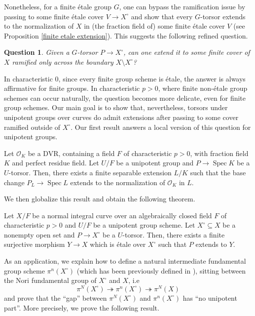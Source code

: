 \documentclass[a4paper,english,12pt]{amsart}
\newtheorem*{question}{Question}
\numberwithin{equation}{section}
\newenvironment{customthm}[1]
  {\renewcommand\theinnercustomthm{#1}\innercustomthm}
  {\endinnercustomthm}
\DeclareMathOperator{\Spec}{Spec}
\renewcommand{\_}{\rule{0.25cm}{0.4pt}}
\begin{document}
Nonetheless, for a finite étale group $G$, one can bypass the ramification issue by passing to some finite étale cover $V\to X^{\circ}$ and show that every $G$-torsor extends to the normalization of $X$ in (the fraction field of) some finite étale cover $V$ (see Proposition \ref{finite etale extension}). This suggests the following refined question.

\begin{question}
Given a $G$-torsor $P \to X^{\circ}$, can one extend it to some finite cover of $X$ ramified only across the boundary $X\setminus X^{\circ}$?
\end{question}

In characteristic $0$, since every finite group scheme is étale, the answer is always affirmative for finite groups. In characteristic $p>0$, where finite non-étale group schemes can occur naturally, the question becomes more delicate, even for finite group schemes. Our main goal is to show that, nevertheless, torsors under unipotent groups over curves do admit extensions after passing to some cover ramified outside of $X^{\circ}$. Our first result answers a local version of this question for unipotent groups.

\begin{customthm}{Theorem A}[Theorem \ref{unipotent}]\label{A}
Let $\mathcal{O}_{K}$ be a DVR, containing a field $F$ of characteristic $p>0$, with fraction field $K$ and perfect residue field. Let $U/F$ be a unipotent group and $P\to \Spec K$ be a $U$-torsor. Then, there exists a finite separable extension $L/K$ such that the base change $P_{L}\to \Spec L$ extends to the normalization of $\mathcal{O}_{K}$ in $L$.
\end{customthm}

We then globalize this result and obtain the following theorem.

\begin{customthm}{Theorem B}[Theorem \ref{unipotente curvas}]\label{B}
Let $X/F$ be a normal integral curve over an algebraically closed field $F$ of characteristic $p>0$ and $U/F$ be a unipotent group scheme. Let $X^{\circ}\subseteq X$ be a nonempty open set and $P\to X^{\circ}$ be a $U$-torsor. Then, there exists a finite surjective morphism $Y\to X$ which is étale over $X^{\circ}$ such that $P$ extends to $Y$.
\end{customthm}

As an application, we explain how to define a natural intermediate fundamental group scheme $\pi^{n}(X^{\circ})$ (which has been previously defined in \cite{Biswas2022-dg}), sitting between the Nori fundamental group of $X^{\circ}$ and $X$, i.e
\[
\pi^{N}(X^{\circ})\twoheadrightarrow \pi^{n}(X^{\circ})\twoheadrightarrow \pi^{N}(X)
\]
and prove that the ``gap'' between $\pi^{N}(X^{\circ})$ and $\pi^{n}(X^{\circ})$ has ``no unipotent part''. More precisely, we prove the following result.
\end{document}
